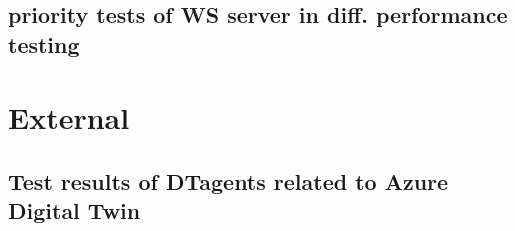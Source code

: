 \subsection{priority tests of WS server in diff. performance testing} \label{chap: Result-priority}

\section{External}\label{chap: Result-External}

\subsection{Test results of DTagents related to Azure Digital Twin} \label{chap: Result-DT}